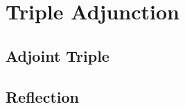 \documentclass{drl-common/llncs}
\newcommand{\C}{\ensuremath{\mathcal{C}}}
\newcommand{\la}{\ensuremath{\dashv}}
\newcommand{\sh}{\text{\textesh}}
\newcommand\F[2]{\ensuremath{F_{#1} \,\, #2}}
\newcommand\U[2]{\ensuremath{U_{#1} \,\, #2}}
\begin{document}
\section{Triple Adjunction}
\label{sec:triple}


\subsection{Adjoint Triple}

\subsection{Reflection}



\end{document}
